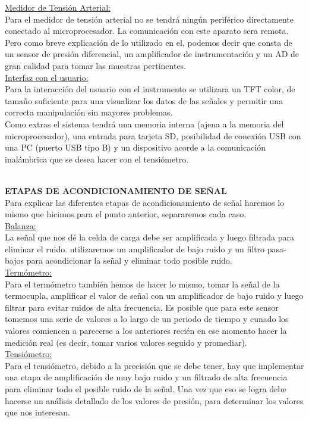 \documentclass[11pt]{report}
\begin{document}
\noindent \underline{Medidor de Tensión Arterial:}\\
Para el medidor de tensión arterial no se tendrá ningún periférico directamente conectado al microprocesador. La comunicación con este aparato sera remota. Pero como breve explicación de lo utilizado en el, podemos decir que consta de un sensor de presión diferencial, un amplificador de instrumentación y un AD de gran calidad para tomar las muestras pertinentes.\\

\noindent \underline{Interfaz con el usuario:}\\
Para la interacción del usuario con el instrumento se utilizara un TFT color, de tamaño suficiente para una visualizar los datos de las señales y permitir una correcta manipulación sin mayores problemas. \\
Como extras el sistema tendrá una memoria interna (ajena a la memoria del microprocesador), una entrada para tarjeta SD, posibilidad de conexión USB con una PC (puerto USB tipo B) y un dispositivo acorde a la comunicación inalámbrica
que se desea hacer con el tensiómetro.\\

\hfill
\\ \hfill

 \noindent \large \textbf{ETAPAS DE ACONDICIONAMIENTO DE SEÑAL} \\

Para explicar las diferentes etapas de acondicionamiento de señal haremos lo mismo que hicimos para el punto anterior, separaremos cada caso.\\

\noindent \underline{Balanza:} \\
La señal que nos dé la celda de carga debe ser amplificada y luego filtrada para
eliminar el ruido. utilizaremos un amplificador de bajo ruido y un filtro pasa-bajos para acondicionar la señal y eliminar todo posible ruido.\\

\noindent \underline{Termómetro:} \\
Para el termómetro también hemos de hacer lo mismo, tomar la señal de la termocupla, amplificar el valor de señal con un amplificador de bajo ruido y luego filtrar para evitar ruidos de alta frecuencia. Es posible que para este sensor tomemos una serie de valores a lo largo de un periodo de tiempo y cunado los valores comiencen a parecerse a los anteriores recién en ese momento hacer la medición real (es decir, tomar varios valores seguido y promediar). \\

\noindent \underline{Tensiómetro:} \\
Para el tensiómetro, debido a la precisión que se debe tener, hay que implementar una etapa de amplificación de muy bajo ruido y un filtrado de alta frecuencia para eliminar todo el posible ruido de la señal. Una vez que eso se logra debe hacerse un análisis detallado de los valores de presión, para determinar los valores que nos interesan.\\
\end{document}
